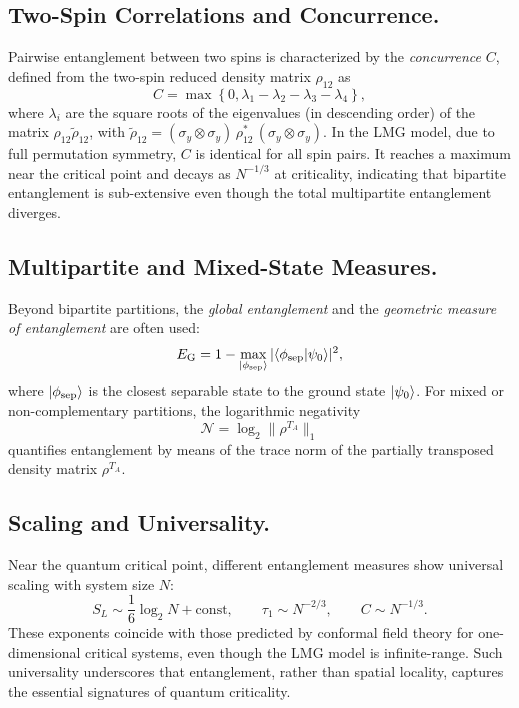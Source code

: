 \documentclass[twocolumn,superscriptaddress,unsortedaddress,nofootinbib,amsmath,amssymb,
aps,floatfix]{revtex4-2}
\begin{document}
\subsection{Two-Spin Correlations and Concurrence.}
Pairwise entanglement between two spins is characterized by the \emph{concurrence} $C$,
defined from the two-spin reduced density matrix $\rho_{12}$ as
\begin{equation}
  C = \max \left\{ 0, \lambda_1 - \lambda_2 - \lambda_3 - \lambda_4 \right\},
\end{equation}
where $\lambda_i$ are the square roots of the eigenvalues (in descending order)
of the matrix $\rho_{12} \tilde{\rho}_{12}$, with
$\tilde{\rho}_{12} = (\sigma_y \otimes \sigma_y)\, \rho_{12}^*\, (\sigma_y \otimes \sigma_y)$.
In the LMG model, due to full permutation symmetry, $C$ is identical for all spin pairs.
It reaches a maximum near the critical point and decays as $N^{-1/3}$ at criticality,
indicating that bipartite entanglement is sub-extensive even though the total
multipartite entanglement diverges.

\subsection{Multipartite and Mixed-State Measures.}
Beyond bipartite partitions, the \emph{global entanglement} and the
\emph{geometric measure of entanglement} are often used:
\begin{equation}
  E_{\mathrm{G}} = 1 - \max_{\ket{\phi_{\mathrm{sep}}}} |\langle \phi_{\mathrm{sep}} | \psi_0 \rangle|^2,
\end{equation}
where $\ket{\phi_{\mathrm{sep}}}$ is the closest separable state to the ground state $\ket{\psi_0}$.
For mixed or non-complementary partitions, the logarithmic negativity
\begin{equation}
  \mathcal{N} = \log_2 \| \rho^{T_A} \|_1
\end{equation}
quantifies entanglement by means of the trace norm of the partially transposed density matrix $\rho^{T_A}$.

\subsection{Scaling and Universality.}
Near the quantum critical point, different entanglement measures show universal scaling with system size $N$:
\begin{equation}
  S_L \sim \frac{1}{6} \log_2 N + \mathrm{const}, \qquad
  \tau_1 \sim N^{-2/3}, \qquad
  C \sim N^{-1/3}.
\end{equation}
These exponents coincide with those predicted by conformal field theory
for one-dimensional critical systems, even though the LMG model is infinite-range.
Such universality underscores that entanglement, rather than spatial locality,
captures the essential signatures of quantum criticality.
\end{document}
